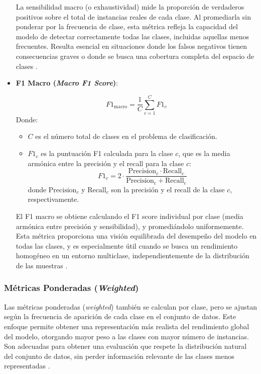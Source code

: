 \begin{itemize}
La sensibilidad macro (o exhaustividad) mide la proporción de verdaderos positivos sobre el total de instancias reales de cada clase. Al promediarla sin ponderar por la frecuencia de clase, esta métrica refleja la capacidad del modelo de detectar correctamente todas las clases, incluidas aquellas menos frecuentes. Resulta esencial en situaciones donde los falsos negativos tienen consecuencias graves o donde se busca una cobertura completa del espacio de clases \cite{powers2011evaluation}.

\item \textbf{F1 Macro (\textit{Macro F1 Score})}:

\begin{equation}
F1_{\text{macro}} = \frac{1}{C} \sum_{c=1}^{C} F1_c
\end{equation}
Donde:
\begin{itemize}
    \item \( C \) es el número total de clases en el problema de clasificación.
    \item \( F1_c \) es la puntuación F1 calculada para la clase \( c \), que es la media armónica entre la precisión y el recall para la clase \( c \):
    \[
    F1_c = 2 \cdot \frac{\text{Precision}_c \cdot \text{Recall}_c}{\text{Precision}_c + \text{Recall}_c}
    \]
    donde \( \text{Precision}_c \) y \( \text{Recall}_c \) son la precisión y el recall de la clase \( c \), respectivamente.
\end{itemize}


El F1 macro se obtiene calculando el F1 score individual por clase (media armónica entre precisión y sensibilidad), y promediándolo uniformemente. Esta métrica proporciona una visión equilibrada del desempeño del modelo en todas las clases, y es especialmente útil cuando se busca un rendimiento homogéneo en un entorno multiclase, independientemente de la distribución de las muestras \cite{Sokolova2006}.

\end{itemize}

\subsubsection*{Métricas Ponderadas (\textit{Weighted})}

Las métricas ponderadas (\textit{weighted}) también se calculan por clase, pero se ajustan según la frecuencia de aparición de cada clase en el conjunto de datos. Este enfoque permite obtener una representación más realista del rendimiento global del modelo, otorgando mayor peso a las clases con mayor número de instancias. Son adecuadas para obtener una evaluación que respete la distribución natural del conjunto de datos, sin perder información relevante de las clases menos representadas \cite{Chawla2003}.

